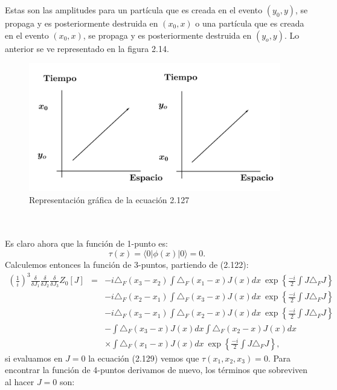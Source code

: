 Estas son las amplitudes para un partícula que es creada en el evento $(y_0,y)$, se propaga y es posteriormente destruida en $(x_0,x)$ o una partícula que es creada en el evento $(x_0,x)$, se propaga y es posteriormente destruida en $(y_o,y)$. Lo anterior se ve representado en la figura 2.14.
\begin{figure}[h!]
\centering
\includegraphics[width=11cm]{Imagenes/Fig15}
\caption[Representación gráfica de la función de 2-puntos ]{Representación gráfica de la ecuación 2.127}
\end{figure}
\\
\\
Es claro ahora que la función de 1-punto es:
\begin{equation}
\tau(x)=\langle 0|\phi(x)|0\rangle=0 .
\end{equation}
Calculemos entonces la función de 3-puntos, partiendo de (2.122):
\begin{eqnarray}
\nonumber\left(\frac{1}{i}\right)^{3}\frac{\delta}{\delta J_{1}}\frac{\delta}{\delta J_{2}}\frac{\delta}{\delta J_{3}}Z_{0}[J]&=&-i\triangle_{F}(x_{3}-x_{2})\int\triangle_{F}(x_{1}-x)J(x)dx\ \exp\left\{ \frac{-i}{2}\int J\triangle_{F}J\right\}\\
\nonumber && -i\triangle_{F}(x_{2}-x_{1})\int\triangle_{F}(x_{3}-x)J(x)dx\ \exp\left\{ \frac{-i}{2}\int J\triangle_{F}J\right\}\\
\nonumber &&-i\triangle_{F}(x_{3}-x_{1})\int\triangle_{F}(x_{2}-x)J(x)dx\ \exp\left\{ \frac{-i}{2}\int J\triangle_{F}J\right\}\\
\nonumber &&-\int\triangle_{F}(x_{3}-x)J(x)dx\int\triangle_{F}(x_{2}-x)J(x)dx\\
&&\times\int\triangle_{F}(x_{1}-x)J(x)dx\ \exp\left\{ \frac{-i}{2}\int J\triangle_{F}J\right\} ,
\end{eqnarray}
si evaluamos en $J=0$ la ecuación (2.129) vemos que $\tau(x_1,x_2,x_3)=0$. Para encontrar la función de 4-puntos derivamos de nuevo, los términos que sobreviven al hacer $J=0$ son:
